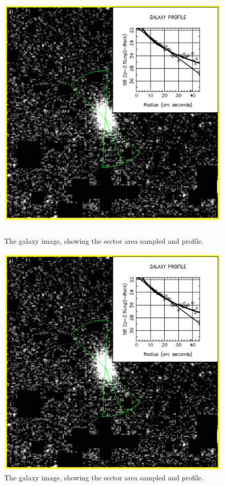 \documentclass[twoside,11pt]{article}
\newenvironment{latexonly}{}{}
\begin{document}
\begin{latexonly}
\begin{figure}[htlb]
\centering
\includegraphics[height=125mm,width=125mm]{sun180_diag4}
\caption{The galaxy image, showing the sector area sampled and profile.}
\end{figure}
\end{latexonly}
\begin{htmlonly}
\begin{figure}[htlb]
\centering
\includegraphics{sun180_diag4}
\caption{The galaxy image, showing the sector area sampled and profile.}
\end{figure}
\end{htmlonly}
\end{document}

